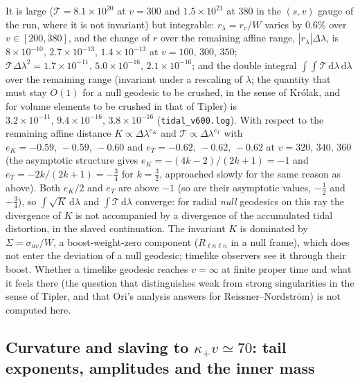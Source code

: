 \documentclass[11pt]{article}
\begin{document}
It is large ($\mathcal T=8.1\times10^{20}$ at $v=300$ and $1.5\times10^{21}$ at $380$ in the $(s,v)$ gauge of the run, where it is not invariant) but integrable: $r_\lambda=r_v/W$ varies by $0.6\%$ over $v\in[200,380]$, and the change of $r$ over the remaining affine range, $|r_\lambda|\Delta\lambda$, is $8\times10^{-10},\,2.7\times10^{-13},\,1.4\times10^{-13}$ at $v=100,\,300,\,350$; $\mathcal T\Delta\lambda^{2}=1.7\times10^{-11},\,5.0\times10^{-16},\,2.1\times10^{-16}$; and the double integral $\int\!\!\int\mathcal T\,\mathrm d\lambda\,\mathrm d\lambda$ over the remaining range (invariant under a rescaling of $\lambda$; the quantity that must stay $O(1)$ for a null geodesic to be crushed, in the sense of Kr\'olak, and for volume elements to be crushed in that of Tipler) is $3.2\times10^{-11},\,9.4\times10^{-16},\,3.8\times10^{-16}$ (\texttt{tidal\_v600.log}). With respect to the remaining affine distance $K\propto\Delta\lambda^{e_K}$ and $\mathcal T\propto\Delta\lambda^{e_T}$ with $e_K=-0.59,\,-0.59,\,-0.60$ and $e_T=-0.62,\,-0.62,\,-0.62$ at $v=320,\,340,\,360$ (the asymptotic structure gives $e_K=-(4k-2)/(2k+1)=-1$ and $e_T=-2k/(2k+1)=-\tfrac34$ for $k=\tfrac32$, approached slowly for the same reason as above). Both $e_K/2$ and $e_T$ are above $-1$ (so are their asymptotic values, $-\tfrac12$ and $-\tfrac34$), so $\int\!\sqrt K\,\mathrm d\lambda$ and $\int\mathcal T\,\mathrm d\lambda$ converge: for radial \emph{null} geodesics on this ray the divergence of $K$ is not accompanied by a divergence of the accumulated tidal distortion, in the slaved continuation. The invariant $K$ is dominated by $\Sigma=\sigma_{uv}/W$, a boost-weight-zero component ($R_{\ell n\ell n}$ in a null frame), which does not enter the deviation of a null geodesic; timelike observers see it through their boost. Whether a timelike geodesic reaches $v=\infty$ at finite proper time and what it feels there (the question that distinguishes weak from strong singularities in the sense of Tipler, and that Ori's analysis answers for Reissner--Nordstr\"om) is not computed here.

\subsection{Curvature and slaving to \texorpdfstring{$\kappa_+v\simeq70$}{kappa+ v ~ 70}: tail exponents, amplitudes and the inner mass}
\label{sec:curv3}
\end{document}

